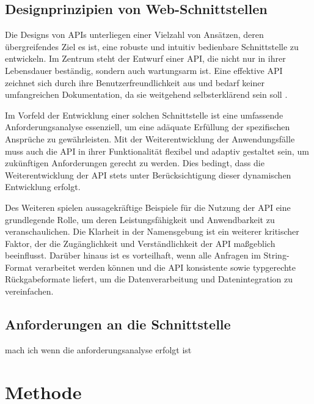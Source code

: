 \documentclass[draft,final]{vutinfth} %
\begin{document}
\section{Designprinzipien von Web-Schnittstellen}

Die Designs von APIs unterliegen einer Vielzahl von Ansätzen, deren übergreifendes Ziel es ist, eine robuste und intuitiv bedienbare Schnittstelle zu entwickeln. 
Im Zentrum steht der Entwurf einer API, die nicht nur in ihrer Lebensdauer beständig, sondern auch wartungsarm ist. 
Eine effektive API zeichnet sich durch ihre Benutzerfreundlichkeit aus und bedarf keiner umfangreichen Dokumentation, da sie weitgehend selbsterklärend sein soll \cite{Bloch:2006:How2DesignGoodAPI}.

Im Vorfeld der Entwicklung einer solchen Schnittstelle ist eine umfassende Anforderungsanalyse essenziell, um eine adäquate Erfüllung der spezifischen Ansprüche zu gewährleisten. 
Mit der Weiterentwicklung der Anwendungsfälle muss auch die API in ihrer Funktionalität flexibel und adaptiv gestaltet sein, um zukünftigen Anforderungen gerecht zu werden. 
Dies bedingt, dass die Weiterentwicklung der API stets unter Berücksichtigung dieser dynamischen Entwicklung erfolgt. \cite{Bloch:2006:How2DesignGoodAPI}

Des Weiteren spielen aussagekräftige Beispiele für die Nutzung der API eine grundlegende Rolle, um deren Leistungsfähigkeit und Anwendbarkeit zu veranschaulichen. 
Die Klarheit in der Namensgebung ist ein weiterer kritischer Faktor, der die Zugänglichkeit und Verständlichkeit der API maßgeblich beeinflusst. Darüber hinaus ist es vorteilhaft, wenn alle Anfragen im String-Format verarbeitet werden können und die API konsistente sowie typgerechte Rückgabeformate liefert, um die Datenverarbeitung und Datenintegration zu vereinfachen. \cite{Bloch:2006:How2DesignGoodAPI}


\section{Anforderungen an die Schnittstelle}

mach ich wenn die anforderungsanalyse erfolgt ist









\chapter{Methode}
\end{document}
